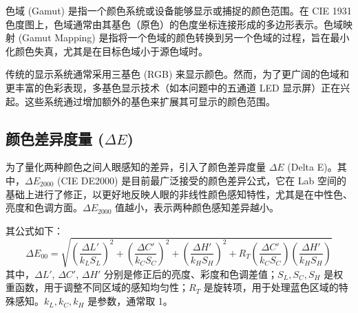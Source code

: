 色域 (Gamut) 是指一个颜色系统或设备能够显示或捕捉的颜色范围。在 CIE 1931 色度图上，色域通常由其基色（原色）的色度坐标连接形成的多边形表示。色域映射 (Gamut Mapping) 是指将一个色域的颜色转换到另一个色域的过程，旨在最小化颜色失真，尤其是在目标色域小于源色域时。

传统的显示系统通常采用三基色 (RGB) 来显示颜色。然而，为了更广阔的色域和更丰富的色彩表现，多基色显示技术（如本问题中的五通道 LED 显示屏）正在兴起。这些系统通过增加额外的基色来扩展其可显示的颜色范围。

\subsection[\hspace{-2pt}颜色差异度量 ($\Delta E$)]{{\heiti{} \hspace{-8pt}颜色差异度量 ($\Delta E$)}}\label{section2: 颜色差异度量}

为了量化两种颜色之间人眼感知的差异，引入了颜色差异度量 $\Delta E$ (Delta E)。其中，$\Delta E_{2000}$ (CIE DE2000) 是目前最广泛接受的颜色差异公式，它在 Lab 空间的基础上进行了修正，以更好地反映人眼的非线性颜色感知特性，尤其是在中性色、亮度和色调方面。$\Delta E_{2000}$ 值越小，表示两种颜色感知差异越小。

其公式如下：
$$\Delta E_{00} = \sqrt{\left(\frac{\Delta L'}{k_L S_L}\right)^2 + \left(\frac{\Delta C'}{k_C S_C}\right)^2 + \left(\frac{\Delta H'}{k_H S_H}\right)^2 + R_T \left(\frac{\Delta C'}{k_C S_C}\right) \left(\frac{\Delta H'}{k_H S_H}\right)}$$
其中，$\Delta L'$, $\Delta C'$, $\Delta H'$ 分别是修正后的亮度、彩度和色调差值；$S_L, S_C, S_H$ 是权重函数，用于调整不同区域的感知均匀性；$R_T$ 是旋转项，用于处理蓝色区域的特殊感知。$k_L, k_C, k_H$ 是参数，通常取 1。


